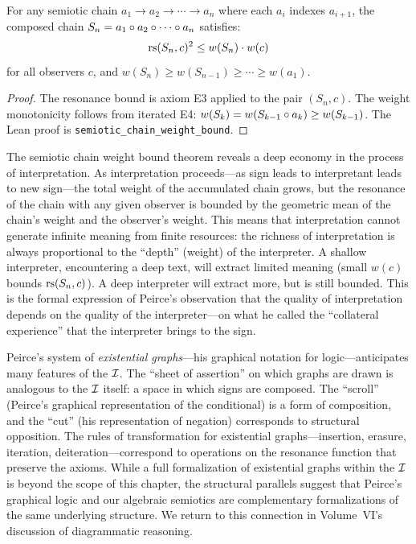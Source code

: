 \begin{theorem}
\label{thm:semiotic-chain-weight}
For any semiotic chain $a_1 \to a_2 \to \cdots \to a_n$ where each $a_i$ indexes $a_{i+1}$, the composed chain $S_n = a_1 \circ a_2 \circ \cdots \circ a_n$ satisfies:
\[
  \mathrm{rs}(S_n, c)^2 \leq w(S_n) \cdot w(c)
\]
for all observers $c$, and $w(S_n) \geq w(S_{n-1}) \geq \cdots \geq w(a_1)$.
\end{theorem}

\begin{proof}
The resonance bound is axiom E3 applied to the pair $(S_n, c)$. The weight monotonicity follows from iterated E4: $w(S_k) = w(S_{k-1} \circ a_k) \geq w(S_{k-1})$. The Lean proof is \texttt{semiotic\_chain\_weight\_bound}.
\end{proof}

\begin{interpretation}
The semiotic chain weight bound theorem reveals a deep economy in the process of interpretation. As interpretation proceeds---as sign leads to interpretant leads to new sign---the total weight of the accumulated chain grows, but the resonance of the chain with any given observer is bounded by the geometric mean of the chain's weight and the observer's weight. This means that interpretation cannot generate infinite meaning from finite resources: the richness of interpretation is always proportional to the ``depth'' (weight) of the interpreter. A shallow interpreter, encountering a deep text, will extract limited meaning (small $w(c)$ bounds $\mathrm{rs}(S_n, c)$). A deep interpreter will extract more, but is still bounded. This is the formal expression of Peirce's observation that the quality of interpretation depends on the quality of the interpreter---on what he called the ``collateral experience'' that the interpreter brings to the sign.
\end{interpretation}

\begin{remark}
Peirce's system of \emph{existential graphs}---his graphical notation for logic---anticipates many features of the $\mathcal{I}$. The ``sheet of assertion'' on which graphs are drawn is analogous to the $\mathcal{I}$ itself: a space in which signs are composed. The ``scroll'' (Peirce's graphical representation of the conditional) is a form of composition, and the ``cut'' (his representation of negation) corresponds to structural opposition. The rules of transformation for existential graphs---insertion, erasure, iteration, deiteration---correspond to operations on the resonance function that preserve the axioms. While a full formalization of existential graphs within the $\mathcal{I}$ is beyond the scope of this chapter, the structural parallels suggest that Peirce's graphical logic and our algebraic semiotics are complementary formalizations of the same underlying structure. We return to this connection in Volume~VI's discussion of diagrammatic reasoning.
\end{remark}

